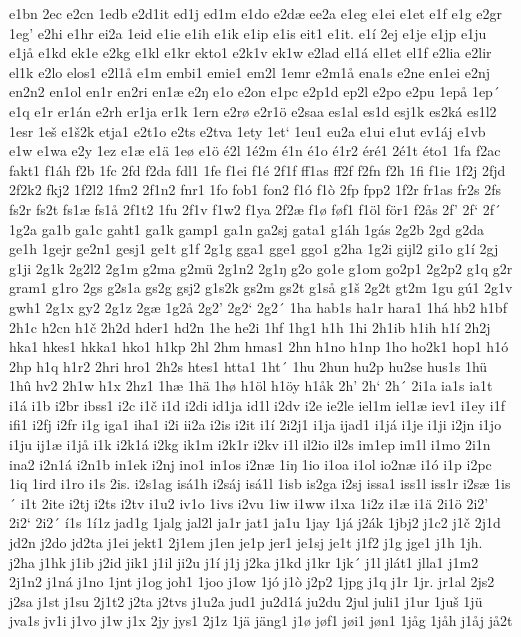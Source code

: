 e1bn
2ec
e2cn
1edb
e2d1it
ed1j
ed1m
e1do
e2dæ
ee2a
e1eg
e1ei
e1et
e1f
e1g
e2gr
1eg'
e2hi
e1hr
ei2a
1eid
e1ie
e1ih
e1ik
e1ip
e1is
eit1
e1it.
e1í
2ej
e1je
e1jp
e1ju
e1jå
e1kd
ek1e
e2kg
e1kl
e1kr
ekto1
e2k1v
ek1w
e2lad
el1á
el1et
el1f
e2lia
e2lir
el1k
e2lo
elos1
e2l1å
e1m
embi1
emie1
em2l
1emr
e2m1å
ena1s
e2ne
en1ei
e2nj
en2n2
en1ol
en1r
en2ri
en1æ
e2ŋ
e1o
e2on
e1pc
e2p1d
ep2l
e2po
e2pu
1epå
1ep´
e1q
e1r
er1án
e2rh
er1ja
er1k
1ern
e2rø
e2r1ö
e2saa
es1al
es1d
esj1k
es2ká
es1l2
1esr
1eš
e1š2k
etja1
e2t1o
e2ts
e2tva
1ety
1et`
1eu1
eu2a
e1ui
e1ut
ev1áj
e1vb
e1w
e1wa
e2y
1ez
e1æ
e1ä
1eø
e1ö
é2l
1é2m
é1n
é1o
é1r2
éré1
2é1t
éto1
1fa
f2ac
fakt1
f1áh
f2b
1fc
2fd
f2da
fdl1
1fe
f1ei
f1é
2f1f
ff1as
ff2f
f2fn
f2h
1fi
f1ie
1f2j
2fjd
2f2k2
fkj2
1f2l2
1fm2
2f1n2
fnr1
1fo
fob1
fon2
f1ó
f1ò
2fp
fpp2
1f2r
fr1as
fr2s
2fs
fs2r
fs2t
fs1æ
fs1å
2f1t2
1fu
2f1v
f1w2
f1ya
2f2æ
f1ø
føf1
f1öl
för1
f2ås
2f'
2f`
2f´
1g2a
ga1b
ga1c
gaht1
ga1k
gamp1
ga1n
ga2sj
gata1
g1áh
1gás
2g2b
2gd
g2da
ge1h
1gejr
ge2n1
gesj1
ge1t
g1f
2g1g
gga1
gge1
ggo1
g2ha
1g2i
gijl2
gi1o
g1í
2gj
g1ji
2g1k
2g2l2
2g1m
g2ma
g2mü
2g1n2
2g1ŋ
g2o
go1e
g1om
go2p1
2g2p2
g1q
g2r
gram1
g1ro
2gs
g2s1a
gs2g
gsj2
g1s2k
gs2m
gs2t
g1så
g1š
2g2t
gt2m
1gu
gú1
2g1v
gwh1
2g1x
gy2
2g1z
2gæ
1g2å
2g2'
2g2`
2g2´
1ha
hab1s
ha1r
hara1
1há
hb2
h1bf
2h1c
h2cn
h1č
2h2d
hder1
hd2n
1he
he2i
1hf
1hg1
h1h
1hi
2h1ib
h1ih
h1í
2h2j
hka1
hkes1
hkka1
hko1
h1kp
2hl
2hm
hmas1
2hn
h1no
h1np
1ho
ho2k1
hop1
h1ó
2hp
h1q
h1r2
2hri
hro1
2h2s
htes1
htta1
1ht´
1hu
2hun
hu2p
hu2se
hus1s
1hü
1hû
hv2
2h1w
h1x
2hz1
1hæ
1hä
1hø
h1öl
h1öy
h1åk
2h'
2h`
2h´
2i1a
ia1s
ia1t
i1á
i1b
i2br
ibss1
i2c
i1č
i1d
i2di
id1ja
id1l
i2dv
i2e
ie2le
iel1m
iel1æ
iev1
i1ey
i1f
ifi1
i2fj
i2fr
i1g
iga1
iha1
i2i
ii2a
i2is
i2it
i1í
2i2j1
i1ja
ijad1
i1já
i1je
i1ji
i2jn
i1jo
i1ju
ij1æ
i1jå
i1k
i2k1á
i2kg
ik1m
i2k1r
i2kv
i1l
il2io
il2s
im1ep
im1l
i1mo
2i1n
ina2
i2n1á
i2n1b
in1ek
i2nj
ino1
in1os
i2næ
1iŋ
1io
i1oa
i1ol
io2næ
i1ó
i1p
i2pc
1iq
1ird
i1ro
i1s
2is.
i2s1ag
isá1h
i2sáj
isá1l
1isb
is2ga
i2sj
issa1
iss1l
iss1r
i2sæ
1is´
i1t
2ite
i2tj
i2ts
i2tv
i1u2
iv1o
1ivs
i2vu
1iw
i1ww
i1xa
1i2z
i1æ
i1ä
2i1ö
2i2'
2i2`
2i2´
í1s
1í1z
jad1g
1jalg
jal2l
ja1r
jat1
ja1u
1jay
1já
j2ák
1jbj2
j1c2
j1č
2j1d
jd2n
j2do
jd2ta
j1ei
jekt1
2j1em
j1en
je1p
jer1
je1sj
je1t
j1f2
j1g
jge1
j1h
1jh.
j2ha
j1hk
j1ib
j2id
jik1
j1il
ji2u
j1í
j1j
j2ka
j1kd
j1kr
1jk´
j1l
jlát1
jlla1
j1m2
2j1n2
j1ná
j1no
1jnt
j1og
joh1
1joo
j1ow
1jó
j1ò
j2p2
1jpg
j1q
j1r
1jr.
jr1al
2js2
j2sa
j1st
j1su
2j1t2
j2ta
j2tvs
j1u2a
jud1
ju2d1á
ju2du
2jul
juli1
j1ur
1juš
1jü
jva1s
jv1i
j1vo
j1w
j1x
2jy
jys1
2j1z
1jä
jäng1
j1ø
jøf1
jøi1
jøn1
1jåg
1jåh
j1åj
jå2t
